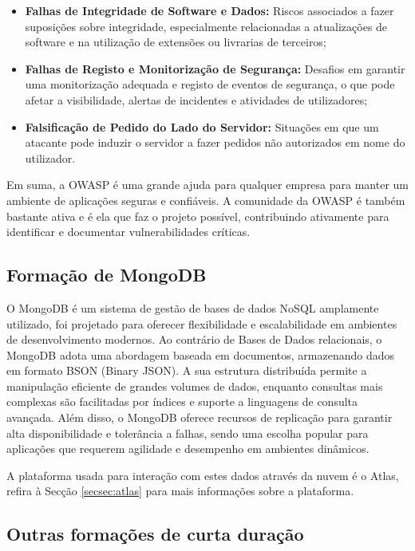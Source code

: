 \begin{itemize}
        \item \textbf{Falhas de Integridade de Software e Dados:} Riscos associados a fazer suposições sobre integridade, especialmente relacionadas a atualizações de software e na utilização de extensões ou livrarias de terceiros;
      
        \item \textbf{Falhas de Registo e Monitorização de Segurança:} Desafios em garantir uma monitorização adequada e registo de eventos de segurança, o que pode afetar a visibilidade, alertas de incidentes e atividades de utilizadores;
      
        \item \textbf{Falsificação de Pedido do Lado do Servidor:} Situações em que um atacante pode induzir o servidor a fazer pedidos não autorizados em nome do utilizador\cite{OWASP-top-ten}.
      \end{itemize}

      Em suma, a OWASP é uma grande ajuda para qualquer empresa para manter um ambiente de aplicações seguras e confiáveis. A comunidade da OWASP é também bastante ativa e é ela que faz o projeto possível, contribuindo ativamente para identificar e documentar vulnerabilidades críticas.

    \subsection{Formação de MongoDB}\label{subsec:mongodb}

      O MongoDB é um sistema de gestão de bases de dados NoSQL amplamente utilizado, foi projetado para oferecer flexibilidade e escalabilidade em ambientes de desenvolvimento modernos. Ao contrário de Bases de Dados relacionais, o MongoDB adota uma abordagem baseada em documentos, armazenando dados em formato BSON (Binary JSON). A sua estrutura distribuída permite a manipulação eficiente de grandes volumes de dados, enquanto consultas mais complexas são facilitadas por índices e suporte a linguagens de consulta avançada. Além disso, o MongoDB oferece recursos de replicação para garantir alta disponibilidade e tolerância a falhas, sendo uma escolha popular para aplicações que requerem agilidade e desempenho em ambientes dinâmicos\cite{what-is-mongodb}.

      A plataforma usada para interação com estes dados através da nuvem é o Atlas, refira à Secção \ref{secsec:atlas} para mais informações sobre a plataforma.

    \subsection{Outras formações de curta duração}\label{subsec:outras-formacoes}

